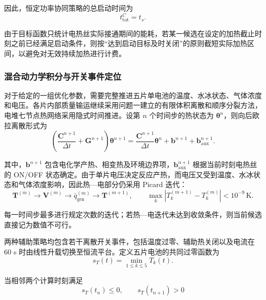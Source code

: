 \documentclass[bwprint]{gmcmthesis}
\numberwithin{figure}{section}
\begin{document}
\noindent 因此，恒定功率协同策略的总启动时间为
\begin{equation}
t_{\text{tot}}^C = t_s. \tag{6-37}
\end{equation}

\noindent 由于目标函数只统计电热丝实际接通期间的能耗，若某一候选在设定的加热截止时刻之前已经满足启动条件，则按“达到启动目标及时关闭”的原则截短实际加热区间，以避免对无效持续加热进行计费。

\subsubsection{混合动力学积分与开关事件定位}

\noindent 对于给定的一组优化参数，需要完整推进五片单电池的温度、水冰状态、气体浓度和电压。各片内部质量输运继续采用问题一建立的有限体积离散和顺序分裂方法，电堆七节点热网络采用隐式时间推进。设第 \(n\) 个时间步的热状态为 \(\boldsymbol{\theta}^n\)，则向后欧拉离散形式为
\begin{equation}
\left( \frac{\mathbf{C}^{n+1}}{\Delta t} + \mathbf{G}^{n+1} \right) \boldsymbol{\theta}^{n+1} = \frac{\mathbf{C}^{n+1}}{\Delta t} \boldsymbol{\theta}^n + \mathbf{b}^{n+1} + \mathbf{b}_{\text{aux}}^{n+1}. \tag{6-38}
\end{equation}

\noindent 其中，\(\mathbf{b}^{n+1}\) 包含电化学产热、相变热及环境边界项，\(\mathbf{b}_{\text{aux}}^{n+1}\) 根据当前时刻电热丝的 ON/OFF 状态确定。由于单片电压决定反应产热，而电压又受到温度、水冰状态和气体浓度影响，因此热—电部分仍采用 Picard 迭代：
\begin{equation}
\boldsymbol{T}^{(m)} \to \boldsymbol{V}^{(m)} \to \bar{q}_{\text{gen}}^{(m)} \to \boldsymbol{T}^{(m+1)}, \qquad \max_k \left| T_k^{(m+1)} - T_k^{(m)} \right| < 10^{-9} \, \text{K}. \tag{6-39}
\end{equation}

\noindent 每一时间步最多进行规定次数的迭代；若热—电迭代未达到收敛条件，则当前候选直接记为数值不可行。

\noindent 两种辅助策略均包含若干离散开关事件，包括温度过零、辅助热关闭以及电流在 60 s 时由线性升载切换至恒流平台。定义五片电池的共同过零函数为
\begin{equation}
s_T(t) = \min_{1 \leq k \leq 5} T_k(t). \tag{6-40}
\end{equation}

\noindent 当相邻两个计算时刻满足
\begin{equation}
s_T(t_n) \leq 0, \qquad s_T(t_{n+1}) > 0 \tag{6-41}
\end{equation}
\end{document}
